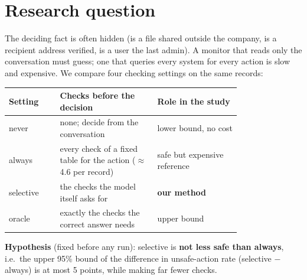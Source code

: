 \documentclass[10pt]{article}
\begin{document}
\section{Research question}
The deciding fact is often hidden (is a file shared outside the company, is a recipient address verified, is a user
the last admin). A monitor that reads only the conversation must guess; one that queries every system for every
action is slow and expensive. We compare four checking settings on the same records:

\begin{center}\small
\begin{tabular}{@{}lL{0.42\linewidth}L{0.36\linewidth}@{}}
\toprule
\textbf{Setting} & \textbf{Checks before the decision} & \textbf{Role in the study}\\
\midrule
never & none; decide from the conversation & lower bound, no cost\\
always & every check of a fixed table for the action ($\approx$4.6 per record) & safe but expensive reference\\
selective & the checks the model itself asks for & \textbf{our method}\\
oracle & exactly the checks the correct answer needs & upper bound\\
\bottomrule
\end{tabular}
\end{center}

\textbf{Hypothesis} (fixed before any run): selective is \textbf{not less safe than always}, i.e.\ the upper 95\%
bound of the difference in unsafe-action rate (selective $-$ always) is at most 5 points, while making far fewer
checks.
\end{document}
